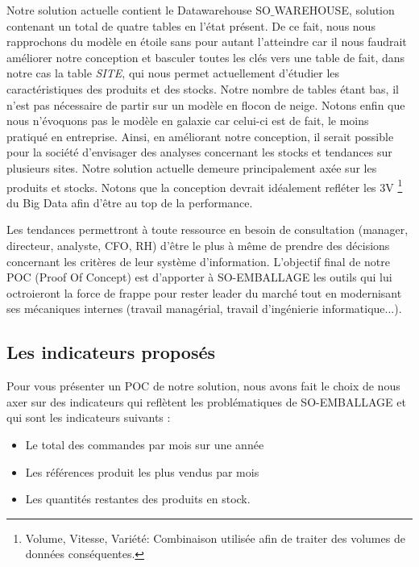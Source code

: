 Notre solution actuelle contient le Datawarehouse SO$\_$WAREHOUSE, solution contenant un total de quatre tables en l’état présent. De ce fait, nous nous rapprochons du modèle en étoile sans pour autant l’atteindre car il nous faudrait améliorer notre conception et basculer toutes les clés vers une table de fait, dans notre cas la table \textit{SITE}, qui nous permet actuellement d’étudier les caractéristiques des produits et des stocks. Notre nombre de tables étant bas, il n’est pas nécessaire de partir sur un modèle en flocon de neige. Notons enfin que nous n’évoquons pas le modèle en galaxie car celui-ci est de fait, le moins pratiqué en entreprise. Ainsi, en améliorant notre conception, il serait possible pour la société d’envisager des analyses concernant les stocks et tendances sur plusieurs sites. Notre solution actuelle demeure principalement axée sur les produits et stocks. Notons que la conception devrait idéalement refléter les 3V \footnote{Volume, Vitesse, Variété: Combinaison utilisée afin de traiter des volumes de données conséquentes.} du Big Data afin d'être au top de la performance.   



\vertspace

Les tendances permettront à toute ressource en besoin de consultation (manager, directeur, analyste, CFO, RH) d’être le plus à même de prendre des décisions concernant les critères de leur système d’information. L’objectif final de notre POC (Proof Of Concept) est d’apporter à SO-EMBALLAGE les outils qui lui octroieront la force de frappe pour rester leader du marché tout en modernisant ses mécaniques internes (travail managérial, travail d’ingénierie informatique...).  

\subsection{Les indicateurs proposés}

Pour vous présenter un POC de notre solution, nous avons fait le choix de nous axer sur des indicateurs qui reflètent les problématiques de SO-EMBALLAGE et qui sont les indicateurs suivants :

\begin{itemize}[label=\textbullet, font=\LARGE \color{listGreen}]
	\item Le total des commandes par mois sur une année 
	\item Les références produit les plus vendus par mois 
	\item Les quantités restantes des produits en stock. 
\end{itemize} 

